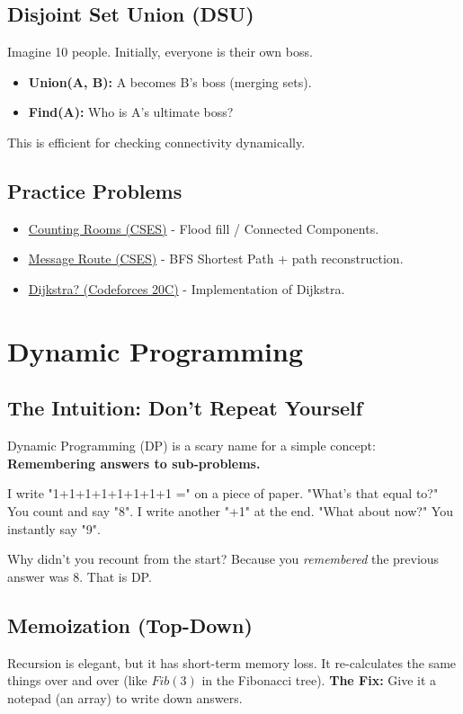 \documentclass[12pt, a4paper]{report}
\begin{document}
\section{Disjoint Set Union (DSU)}
Imagine 10 people. Initially, everyone is their own boss.
\begin{itemize}
    \item \textbf{Union(A, B):} A becomes B's boss (merging sets).
    \item \textbf{Find(A):} Who is A's ultimate boss?
\end{itemize}
This is efficient for checking connectivity dynamically.

\section{Practice Problems}
\begin{itemize}
    \item \href{https://cses.fi/problemset/task/1192}{Counting Rooms (CSES)} - Flood fill / Connected Components.
    \item \href{https://cses.fi/problemset/task/1667}{Message Route (CSES)} - BFS Shortest Path + path reconstruction.
    \item \href{https://codeforces.com/problemset/problem/20/C}{Dijkstra? (Codeforces 20C)} - Implementation of Dijkstra.
\end{itemize}

\chapter{Dynamic Programming}
\section{The Intuition: Don't Repeat Yourself}
Dynamic Programming (DP) is a scary name for a simple concept: \textbf{Remembering answers to sub-problems.}

\begin{thinkbox}
I write "1+1+1+1+1+1+1+1 =" on a piece of paper.
"What's that equal to?"
You count and say "8".
I write another "+1" at the end. "What about now?"
You instantly say "9".
\end{thinkbox}
Why didn't you recount from the start? Because you \textit{remembered} the previous answer was 8. That is DP.

\section{Memoization (Top-Down)}
Recursion is elegant, but it has short-term memory loss. It re-calculates the same things over and over (like $Fib(3)$ in the Fibonacci tree).
\textbf{The Fix:} Give it a notepad (an array) to write down answers.
\end{document}

